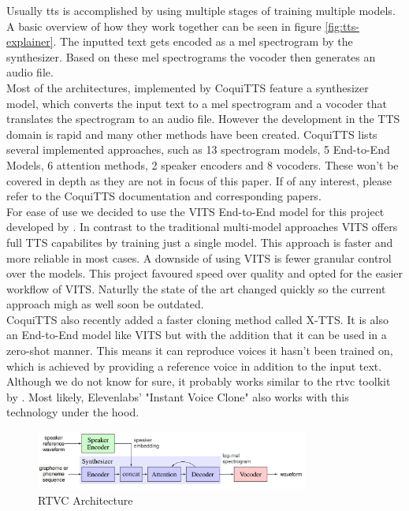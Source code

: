 \documentclass[
  a4paper,  %
  twoside,  %
  bibliography=totoc,
  headsepline,
  cleardoublepage=empty,
  parskip=half,
  draft=false
]{scrbook}
\begin{document}
Usually \gls{tts} is accomplished by using multiple stages of training multiple models. A basic overview of how they work together can be seen in figure \ref{fig:tts-explainer}. The inputted text gets encoded as a mel spectrogram by the synthesizer. Based on these mel spectrograms the vocoder then generates an audio file. \\
Most of the architectures, implemented by CoquiTTS feature a synthesizer model, which converts the input text to a mel spectrogram and a vocoder that translates the spectrogram to an audio file. However the development in the TTS domain is rapid and many other methods have been created. 
CoquiTTS lists several implemented approaches, such as 13 spectrogram models, 5 End-to-End Models, 6 attention methods, 2 speaker encoders and 8 vocoders. These won't be covered in depth as they are not in focus of this paper. If of any interest, please refer to the CoquiTTS documentation and corresponding papers.\\
For ease of use we decided to use the VITS End-to-End model for this project developed by \citet{kimConditionalVariationalAutoencoder2021}. In contrast to the traditional multi-model approaches VITS offers full TTS capabilites by training just a single model. This approach is faster and more reliable in most cases. A downside of using VITS is fewer granular control over the models. This project favoured speed over quality and opted for the easier workflow of VITS. Naturlly the state of the art changed quickly so the current approach migh as well soon be outdated. \\
CoquiTTS also recently added a faster cloning method called X-TTS. It is also an End-to-End model like VITS but with the addition that it can be used in a zero-shot manner. This means it can reproduce voices it hasn't been trained on, which is achieved by providing a reference voice in addition to the input text. Although we do not know for sure, it probably works similar to the \gls{rtvc} toolkit by \citeauthor{jemineRealTimeVoiceCloning2019}. Most likely, Elevenlabs' "Instant Voice Clone" also works with this technology under the hood.

\begin{figure}[h]
  \centering
  \includegraphics[width=0.8\textwidth]{./graphics/images/rtvc.png}
  \caption{RTVC Architecture \cite{jemineRealTimeVoiceCloning2019}}
  \label{fig:rtvc-arch}
\end{figure}
\end{document}
